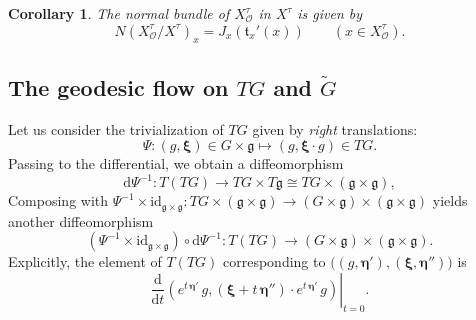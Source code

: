 \documentclass[12pt,a4paper]{article}
\theoremstyle{plain}
\newtheorem{cor}[thm]{Corollary}%
\theoremstyle{definition}
\begin{document}
\begin{cor}
\label{cor:normal bundle Xtau}
The normal bundle 
of $X^\tau_{\mathcal{O}}$ in $X^\tau$ is given by
$$
N\left(X^\tau_{\mathcal{O}}/X^\tau\right)_x=
J_x\left( \mathfrak{t}_x'(x)  \right)
\qquad (x\in X^\tau_{\mathcal{O}}).
$$
\end{cor}




\subsection{The geodesic flow on $TG$ and $\tilde{G}$}



%
Let us consider the trivialization of $TG$ given by \textit{right}
translations: 
$$
\Psi:(g,\boldsymbol{\xi})\in 
G\times \mathfrak{g}\mapsto (g,\boldsymbol{\xi}\cdot g)\in TG.
$$
Passing to the differential, we obtain a diffeomorphism
$$
\mathrm{d}\Psi^{-1}:T(TG)\rightarrow TG\times T\mathfrak{g}\cong
TG\times (\mathfrak{g}\times \mathfrak{g}),
$$
Composing with 
$\Psi^{-1}\times \mathrm{id}_{\mathfrak{g}\times \mathfrak{g}}:
TG\times (\mathfrak{g}\times \mathfrak{g})\rightarrow
(G\times \mathfrak{g})\times (\mathfrak{g}\times \mathfrak{g})$
yields another diffeomorphism
$$
(\Psi^{-1}\times \mathrm{id}_{\mathfrak{g}\times \mathfrak{g}})\circ 
\mathrm{d}\Psi^{-1}:T(TG)\rightarrow 
(G\times \mathfrak{g})\times (\mathfrak{g}\times \mathfrak{g}).
$$
Explicitly, the element of $T(TG)$ corresponding to 
$\big((g,\boldsymbol{\eta}'),(\boldsymbol{\xi},\boldsymbol{\eta}'')\big)$
is 
$$
\left.\frac{\mathrm{d}}{\mathrm{d}t}
\left(e^{t\,\boldsymbol{\eta}'}\,g,\left(\boldsymbol{\xi}+t\,
\boldsymbol{\eta}''\right)\cdot e^{t\,\boldsymbol{\eta}'}\,g\right)
\right|_{t=0}.
$$
\end{document}

